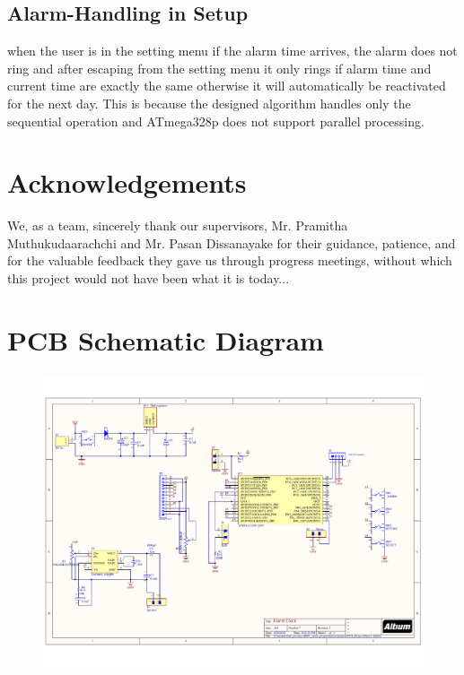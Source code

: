 \documentclass[12pt,twocolumn]{article}
\begin{document}
    \subsection{Alarm-Handling in Setup}
when the user is in the setting menu if the alarm time arrives, the alarm does not ring and after 
escaping from the setting menu it only rings if alarm time and current time are exactly the same 
otherwise it will automatically be reactivated for the next day. This is because the designed algorithm
handles only the sequential operation and ATmega328p does not support parallel processing.

\section{Acknowledgements}
We, as a team, sincerely thank our supervisors, Mr. Pramitha Muthukudaarachchi and
Mr. Pasan Dissanayake for their guidance, patience, and for the valuable feedback they
gave us through progress meetings, without which this project would not have been what it is today...




\newpage
\onecolumn
\appendix
\section{PCB Schematic Diagram}

\begin{center}
\begin{figure}[h]
\includegraphics[width=\textwidth]{schematic.pdf}
\end{figure}
\end{center}
\end{document}
